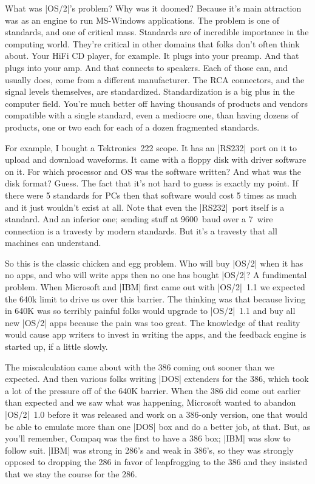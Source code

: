 What was |OS/2|'s problem?  Why was it doomed?  Because it's main attraction
was as an engine to run MS-Windows applications.  The problem is one of
standards, and one of critical mass.  Standards are of incredible importance
in the computing world.  They're critical in other domains that folks
don't often think about.  Your HiFi CD player, for example.  It plugs into
your preamp.  And that plugs into your amp.  And that connects to speakers.
Each of those can, and usually does, come from a different manufacturer.
The RCA connectors, and the signal levels themselves, are standardized.
Standardization is a big plus in the computer field.  You're much better off
having thousands of products and vendors compatible with a single standard,
even a mediocre one, than having dozens of products, one or two each for
each of a dozen fragmented standards.

For example, I bought a Tektronics~222 scope.  It has an |RS232|~port on
it to upload and download waveforms.  It came with a floppy disk with
driver software on it.  For which processor and OS was the software written?
And what was the disk format?  Guess.  The fact that it's not hard to
guess is exactly my point.  If there were 5 standards for PCs then
that software would cost 5 times as much and it just wouldn't exist at all.  
Note that even the |RS232|~port
itself is a standard.  And an inferior one; sending stuff at 9600~baud
over a 7~wire connection is a travesty by modern standards.  But it's
a travesty that all machines can understand.

So this is the classic chicken and egg problem.  Who will buy |OS/2| when
it has no apps, and who will write apps then no one has bought |OS/2|?
A fundimental problem.  When Microsoft and |IBM| first came out with |OS/2|~1.1
we expected the 640k limit to drive us over this barrier.  The thinking
was that because living in 640K was so terribly painful folks would
upgrade to |OS/2|~1.1 and buy all new |OS/2| apps because the pain was too
great.  The knowledge of that reality would cause app writers to
invest in writing the apps, and the feedback engine is started up, if
a little slowly.  

The miscalculation came about with the 386 coming out sooner than we
expected.  And then various folks writing |DOS| extenders for the 386,
which took a lot of the pressure off of the 640K barrier.  When the
386 did come out earlier than expected and we saw what was happening, 
Microsoft wanted to abandon
|OS/2|~1.0 before it was released and work on a 386-only version, one that
would be able to emulate more than one |DOS| box and do a better job, at that.
But, as you'll remember, Compaq was the first to have a 386 box; |IBM|
was slow to follow suit.  |IBM| was strong in 286's and weak in 386's,
so they was strongly opposed to dropping the 286
in favor of leapfrogging to the 386 and they insisted that we stay the course
for the 286.  


